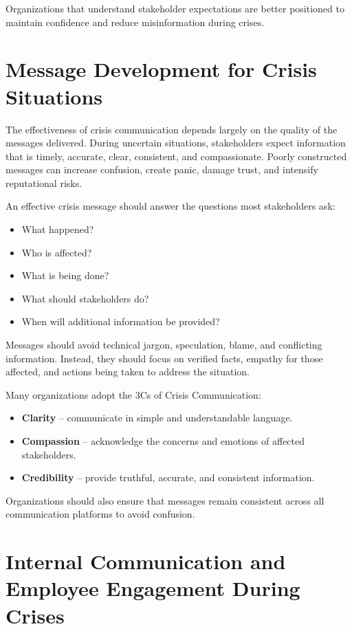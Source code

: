 \documentclass[10pt]{article}
\begin{document}
Organizations that understand stakeholder expectations are better positioned to maintain confidence and reduce misinformation during crises.

\section*{Message Development for Crisis Situations}

The effectiveness of crisis communication depends largely on the quality of the messages delivered. During uncertain situations, stakeholders expect information that is timely, accurate, clear, consistent, and compassionate. Poorly constructed messages can increase confusion, create panic, damage trust, and intensify reputational risks.

An effective crisis message should answer the questions most stakeholders ask:
\begin{itemize}
    \item What happened?
    \item Who is affected?
    \item What is being done?
    \item What should stakeholders do?
    \item When will additional information be provided?
\end{itemize}

Messages should avoid technical jargon, speculation, blame, and conflicting information. Instead, they should focus on verified facts, empathy for those affected, and actions being taken to address the situation.

Many organizations adopt the 3Cs of Crisis Communication:
\begin{itemize}
    \item \textbf{Clarity} -- communicate in simple and understandable language.
    \item \textbf{Compassion} -- acknowledge the concerns and emotions of affected stakeholders.
    \item \textbf{Credibility} -- provide truthful, accurate, and consistent information.
\end{itemize}

Organizations should also ensure that messages remain consistent across all communication platforms to avoid confusion.

\section*{Internal Communication and Employee Engagement During Crises}
\end{document}
